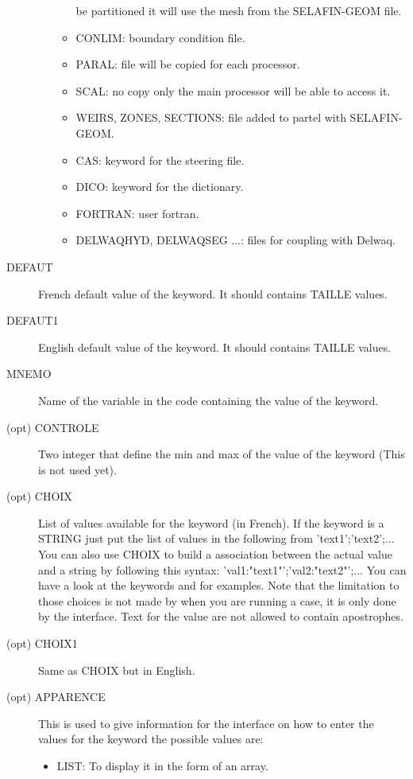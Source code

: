 \begin{description}
\begin{itemize}
\begin{itemize}
          be partitioned it will use the mesh from the SELAFIN-GEOM file.
        \item CONLIM: boundary condition file.
        \item PARAL: file will be copied for each processor.
        \item SCAL: no copy only the main processor will be able to access it.
        \item WEIRS, ZONES, SECTIONS: file added to partel with SELAFIN-GEOM.
        \item CAS: keyword for the steering file.
        \item DICO: keyword for the dictionary.
        \item FORTRAN: user fortran.
        \item DELWAQHYD, DELWAQSEG ...: files for coupling with Delwaq.
      \end{itemize}
  \end{itemize}
\item[DEFAUT] French default value of the keyword. It should contains TAILLE
  values.
\item[DEFAUT1] English default value of the keyword. It should contains TAILLE
  values.
\item[MNEMO] Name of the variable in the code containing the value of the keyword.
\item[(opt) CONTROLE] Two integer that define the min and max of the value of
  the keyword (This is not used yet).
\item[(opt) CHOIX] List of values available for the keyword (in French). If the
  keyword is a STRING just put the list of values in the following from
  'text1';'text2';...  You can also use CHOIX to build a association between
  the actual value and a string by following this syntax:
  'val1:"text1"';'val2:"text2"';... You can have a look at the keywords
   and  for examples.
  Note that the limitation to those choices is not made by \damocles when you
  are running a case, it is only done by the interface. Text for the value are
  not allowed to contain apostrophes.
\item[(opt) CHOIX1] Same as CHOIX but in English.
\item[(opt) APPARENCE] This is used to give information for the interface on
  how to enter the values for the keyword the possible values are:
  \begin{itemize}
    \item LIST: To display it in the form of an array.

\end{itemize}
\end{description}
